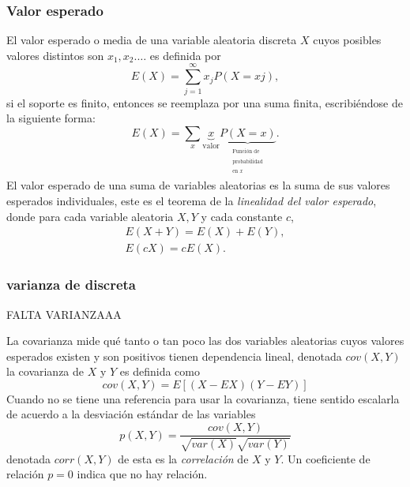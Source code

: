 \subsubsection {Valor esperado}
El valor esperado o media de una variable aleatoria discreta $X$ cuyos posibles valores distintos son $x_1,x_2.\ldots $ es definida por
\begin{equation}
E(X)=\sum_{j=1}^{\infty}x_jP(X=xj),
\end{equation}
si el soporte es finito, entonces se reemplaza por una suma finita, escribiéndose de la siguiente forma:
\begin{equation}
E(X)=\sum_{x}\underbrace{x}_\text{valor}\underbrace{P(X=x)}_{\begin{matrix}^\text{Función de}\\^\text{probabilidad}\\^\text{en $x$}\end{matrix}}.
\end{equation}
El valor esperado de una suma de variables aleatorias es la suma de sus valores esperados individuales, este es el teorema de la \emph{linealidad del valor esperado}, donde para cada variable aleatoria $X,Y$ y cada constante $c$,
\begin{equation}
\begin{matrix}
E(X+Y)=E(X)+E(Y),\\
E(cX)=cE(X).
\end{matrix}
\end{equation}
\subsubsection{varianza de discreta}
FALTA VARIANZAAA

La covarianza mide qué tanto o tan poco las dos variables aleatorias cuyos valores esperados existen y son positivos tienen dependencia lineal, denotada $cov(X,Y)$ la covarianza de $X$ y $Y$ es definida como
\begin{equation}
cov(X,Y)=E[(X-EX)(Y-EY)]
\end{equation}
Cuando no se tiene una referencia para usar la covarianza, tiene sentido escalarla de acuerdo a la desviación estándar de las variables\cite{mat17}
\begin{equation}
p(X,Y)=\frac{cov(X,Y)}{\sqrt{var(X)}\sqrt{var(Y)}}
\end{equation}
denotada $corr(X,Y)$ de esta es la \emph{correlación} de $X$ y $Y$. Un coeficiente de relación $p = 0$ indica que no hay relación.
